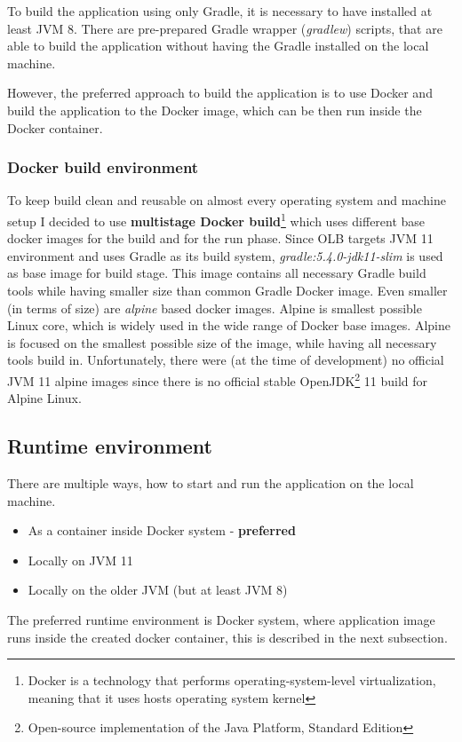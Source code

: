 To build the application using only Gradle,
it is necessary to have installed at least JVM 8.
There are pre-prepared Gradle wrapper (\textit{gradlew}) scripts,
that are able to build the application without having the Gradle installed on the local machine.

However, the preferred approach to build the application is to use Docker
and build the application to the Docker image, 
which can be then run inside the Docker container.

\subsubsection{Docker build environment}
To keep build clean and reusable on almost every operating system and 
machine setup I decided to use 
\textbf{multistage Docker build}\footnote{Docker is a technology that performs operating-system-level virtualization,
meaning that it uses hosts operating system kernel}
which uses different base docker images for the build and for the run phase.
Since OLB targets JVM 11 environment and uses Gradle as its build system,
\textit{gradle:5.4.0-jdk11-slim} is used as base image for build stage.
This image contains all necessary Gradle build tools while having smaller size than common Gradle Docker image.
Even smaller (in terms of size) are \textit{alpine} based docker images. 
Alpine is smallest possible Linux core, 
which is widely used in the wide range of Docker base images.
Alpine is focused on the smallest possible size of the image, 
while having all necessary tools build in.
Unfortunately, there were (at the time of development) no official JVM 11 alpine images
since there is no official stable OpenJDK\footnote{Open-source implementation of the Java Platform, Standard Edition} 
11 build for Alpine Linux.

\subsection{Runtime environment}
There are multiple ways, how to start and run the application on the local machine.
\begin{itemize}
	\item As a container inside Docker system - \textbf{preferred}
	\item Locally on JVM 11
	\item Locally on the older JVM (but at least JVM 8)
\end{itemize}

The preferred runtime environment is Docker system, 
where application image runs inside the created docker container,
this is described in the next subsection.

